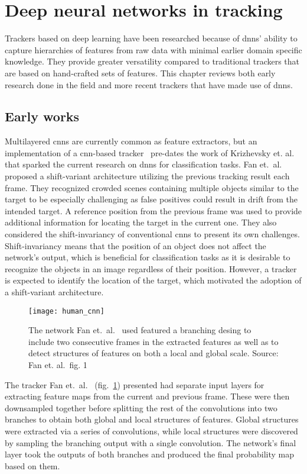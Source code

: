 \section{Deep neural networks in tracking}
Trackers based on deep learning have been researched because of \ac{dnn}s' ability
to capture hierarchies of features from raw data with minimal earlier domain specific
knowledge. They provide greater versatility compared to traditional trackers that are
based on hand-crafted sets of features. This chapter reviews both early research
done in the field and more recent trackers that have made use of \ac{dnn}s.

\subsection{Early works}
Multilayered \ac{cnn}s are currently common as feature extractors, but an implementation
of a \ac{cnn}-based tracker~\cite{HUMAN_CNN} pre-dates the work of Krizhevsky et.
al.~\cite{NIPS_IMAGENET} that sparked the current research on \ac{dnn}s for classification
tasks. Fan et.~al.~\cite{HUMAN_CNN} proposed a shift-variant architecture utilizing the
previous tracking result each frame. They recognized crowded scenes containing multiple
objects similar to the target to be especially challenging as false positives could result
in drift from the intended target. A reference position from the previous frame was used
to provide additional information for locating the target in the current one. They also
considered the shift-invariancy of conventional \ac{cnn}s to present its own challenges.
Shift-invariancy means that the position of an object does not affect the network's output,
which is beneficial for classification tasks as it is desirable to recognize the objects
in an image regardless of their position. However, a tracker is expected to identify the
location of the target, which motivated the adoption of a shift-variant architecture.~\cite{HUMAN_CNN}

\begin{figure}[H]
\centering
\texttt{[image: human\_cnn]}
\caption{The network Fan et.~al.~\cite{HUMAN_CNN} used featured a branching desing to
         include two consecutive frames in the extracted features as well as to detect
         structures of features on both a local and global scale. Source: Fan et.
         al.~fig. 1~\cite{HUMAN_CNN}}\label{fig:human_cnn}
\end{figure}

The tracker Fan et.~al.~\cite{HUMAN_CNN} (fig.~\ref{fig:human_cnn}) presented had separate
input layers for extracting feature maps from the current and previous frame. These were
then downsampled together before splitting the rest of the convolutions into two branches
to obtain both global and local structures of features. Global structures were extracted
via a series of convolutions, while local structures were discovered by sampling the
branching output with a single convolution. The network's final layer took the outputs of
both branches and produced the final probability map based on them.~\cite{HUMAN_CNN}

